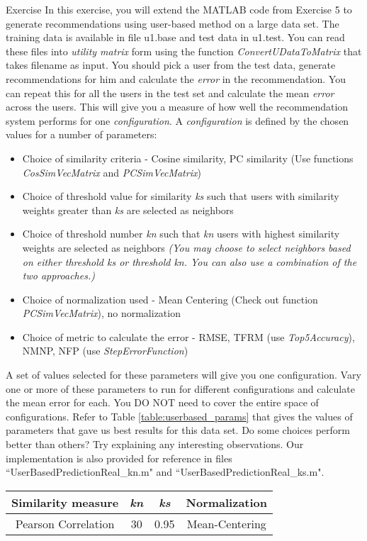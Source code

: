 \begin{myremark}{Exercise }
In this exercise, you will extend the MATLAB code from Exercise 5 to generate recommendations using user-based method on a large data set. The training data is available in file u1.base and test data in u1.test. You can read these files into \textit{utility matrix} form using the function \textit{ConvertUDataToMatrix} that takes filename as input. You should pick a user from the test data, generate recommendations for him and calculate the \textit{error} in the recommendation. You can repeat this for all the users in the test set and calculate the mean \textit{error} across the users. This will give you a measure of how well the recommendation system performs for one \textit{configuration}.
A \textit{configuration} is defined by the chosen values for a number of parameters:
\begin{itemize}
\item{}Choice of similarity criteria - Cosine similarity, PC similarity (Use functions \textit{CosSimVecMatrix} and \textit{PCSimVecMatrix})
\item{}Choice of threshold value for similarity \textit{ks} such that users with similarity weights greater than \textit{ks} are selected as neighbors
\item{}Choice of threshold number \textit{kn} such that \textit{kn} users with highest similarity weights are selected as neighbors 
\textit{(You may choose to select neighbors based on either threshold ks or threshold kn. You can also use a combination of the two approaches.)}
\item{}Choice of normalization used - Mean Centering (Check out function \textit{PCSimVecMatrix}), no normalization
\item{}Choice of metric to calculate the error - RMSE, TFRM (use \textit{Top5Accuracy}), NMNP, NFP (use \textit{StepErrorFunction})
\end{itemize}
A set of values selected for these parameters will give you one configuration. Vary one or more of these parameters to run for different configurations and calculate the mean error for each. You DO NOT need to cover the entire space of configurations. Refer to Table \ref{table:userbased_params} that gives the values of parameters that gave us best results for this data set. Do some choices perform better than others? Try explaining any interesting observations.
Our implementation is also provided for reference in files ``UserBasedPredictionReal\_kn.m" and ``UserBasedPredictionReal\_ks.m".
\end{myremark}

\begin{table*}
\centering
\begin{tabular}{|c|c|c|c|}
\hline
\textbf{Similarity measure} & \textbf{\textit{kn}} & \textbf{\textit{ks}} & \textbf{Normalization}\\ 
\hline
Pearson Correlation		    & 		30		 	 & 			0.95	    &   	Mean-Centering\\ 
\hline
\end{tabular}
\caption{User-based recommendation parameters}
\label{table:userbased_params}
\end{table*}